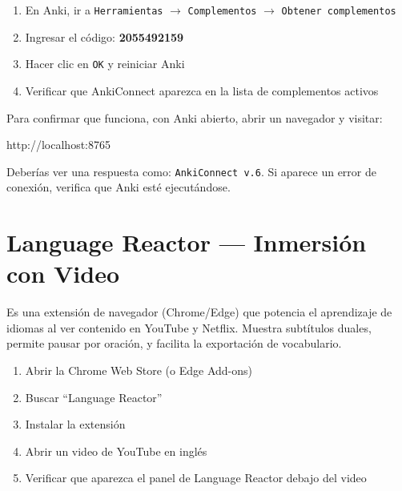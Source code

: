 \documentclass[12pt,a4paper]{article}
\begin{document}
\begin{cajapaso}
\begin{enumerate}[leftmargin=1.2cm]
  \item En Anki, ir a \texttt{Herramientas} $\rightarrow$ \texttt{Complementos} $\rightarrow$ \texttt{Obtener complementos}
  \item Ingresar el código: \textbf{2055492159}
  \item Hacer clic en \texttt{OK} y reiniciar Anki
  \item Verificar que AnkiConnect aparezca en la lista de complementos activos
\end{enumerate}
\end{cajapaso}

\begin{cajaexito}[Verificación]
Para confirmar que funciona, con Anki abierto, abrir un navegador y visitar:

\begin{cajacodigo}
http://localhost:8765
\end{cajacodigo}

Deberías ver una respuesta como: \texttt{AnkiConnect v.6}. Si aparece un error de conexión, verifica que Anki esté ejecutándose.
\end{cajaexito}

\section{Language Reactor — Inmersión con Video}

\begin{cajaherramienta}
Es una extensión de navegador (Chrome/Edge) que potencia el aprendizaje de idiomas al ver contenido en YouTube y Netflix. Muestra subtítulos duales, permite pausar por oración, y facilita la exportación de vocabulario.
\end{cajaherramienta}

\begin{cajapaso}
\begin{enumerate}[leftmargin=1.2cm]
  \item Abrir la Chrome Web Store (o Edge Add-ons)
  \item Buscar ``Language Reactor''
  \item Instalar la extensión
  \item Abrir un video de YouTube en inglés
  \item Verificar que aparezca el panel de Language Reactor debajo del video
\end{enumerate}
\end{cajapaso}
\end{document}
